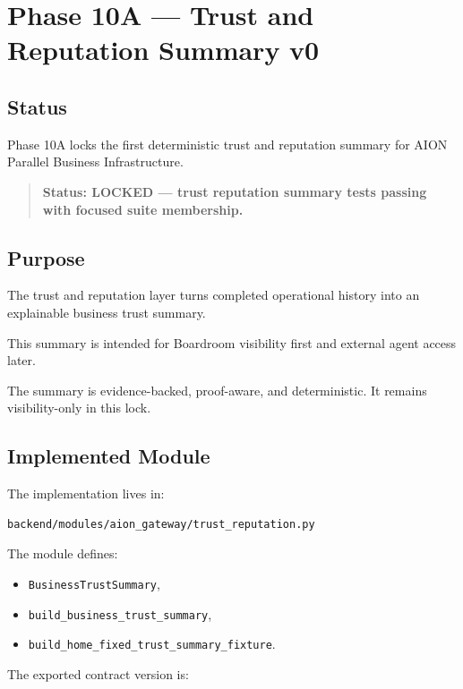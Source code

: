 \section{Phase 10A --- Trust and Reputation Summary v0}
\label{sec:aion-trust-reputation-summary-v0}

\subsection{Status}

Phase 10A locks the first deterministic trust and reputation summary for AION Parallel Business Infrastructure.

\begin{quote}
\textbf{Status: LOCKED --- trust reputation summary tests passing with focused suite membership.}
\end{quote}

\subsection{Purpose}

The trust and reputation layer turns completed operational history into an explainable business trust summary.

This summary is intended for Boardroom visibility first and external agent access later.

The summary is evidence-backed, proof-aware, and deterministic. It remains visibility-only in this lock.

\subsection{Implemented Module}

The implementation lives in:

\begin{verbatim}
backend/modules/aion_gateway/trust_reputation.py
\end{verbatim}

The module defines:

\begin{itemize}
  \item \texttt{BusinessTrustSummary},
  \item \texttt{build\_business\_trust\_summary},
  \item \texttt{build\_home\_fixed\_trust\_summary\_fixture}.
\end{itemize}

The exported contract version is:

